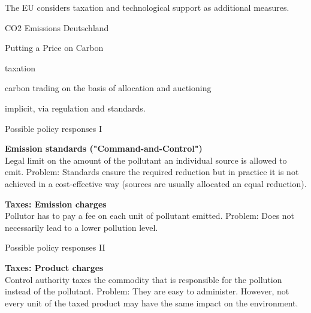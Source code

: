 	The EU  considers taxation and technological support as additional measures.






{CO2 Emissions Deutschland}
\begin{center}
\begin{figure}[h!]
\centering
{}
\label{fig:abatement}
\end{figure}
\end{center}


{Putting a Price on Carbon}

	taxation

	carbon trading on the basis of allocation and auctioning

	implicit, via regulation and standards.

{Possible policy responses I}

	\textbf{Emission standards ("Command-and-Control")} \\
        Legal limit on the amount of the pollutant an individual source is allowed to emit. %
        Problem: Standards ensure the required reduction but in practice it is not achieved in a cost-effective way (sources are usually allocated an equal reduction).

	\textbf{Taxes: Emission charges} \\
        Pollutor has to pay a fee on each unit of pollutant emitted. %
        Problem: Does not necessarily lead to a lower pollution level.

{Possible policy responses II}

	\textbf{Taxes: Product charges} \\
        Control authority taxes the commodity that is responsible for the pollution instead of the pollutant. %
        Problem: They are easy to administer. However, not every unit of the taxed product may have the same impact on the environment. \\

